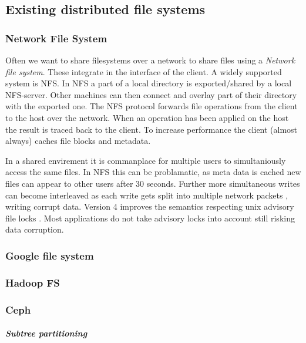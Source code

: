 \subsection{Existing distributed file systems}



\subsubsection*{Network File System}
Often we want to share filesystems over a network to share files using a \textit{Network file system}. These integrate in the interface of the client. A widely supported system is \textsc{NFS}. In \textsc{NFS} a part of a local directory is exported/shared by a local \textsc{NFS}-server. Other machines can then connect and overlay part of their directory with the exported one. The NFS protocol forwards file operations from the client to the host over the network. When an operation has been applied on the host the result is traced back to the client. To increase performance the client (almost always) caches file blocks and metadata. 

In a shared envirement it is commanplace for multiple users to simultaniously access the same files. In \textsc{NFS} this can be problamatic, as meta data is cached new files can appear to other users after 30 seconds. Further more simultaneous writes can become interleaved as each write gets split into multiple network packets \cite[p. 527]{os}, writing corrupt data. Version 4 improves the semantics respecting unix advisory file locks \cite{rfc3530}. Most applications do not take advisory locks into account still risking data corruption. 

\subsubsection*{Google file system}
\subsubsection*{Hadoop FS}

\subsubsection*{Ceph}

\subparagraph{Subtree partitioning}
